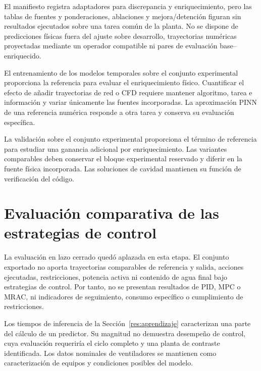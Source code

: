 El manifiesto registra adaptadores para discrepancia y enriquecimiento, pero las tablas de fuentes y ponderaciones, ablaciones y mejora/detención figuran sin resultados ejecutados sobre una tarea común de la planta. No se dispone de predicciones físicas fuera del ajuste sobre desarrollo, trayectorias numéricas proyectadas mediante un operador compatible ni pares de evaluación base--enriquecido.

El entrenamiento de los modelos temporales sobre el conjunto experimental proporciona la referencia para evaluar el enriquecimiento físico. Cuantificar el efecto de añadir trayectorias de red o CFD requiere mantener algoritmo, tarea e información y variar únicamente las fuentes incorporadas. La aproximación PINN de una referencia numérica responde a otra tarea y conserva su evaluación específica.

La validación sobre el conjunto experimental proporciona el término de referencia para estudiar una ganancia adicional por enriquecimiento. Las variantes comparables deben conservar el bloque experimental reservado y diferir en la fuente física incorporada. Las soluciones de cavidad mantienen su función de verificación del código.

\FloatBarrier

\section{Evaluación comparativa de las estrategias de control}
\label{res:control}

La evaluación en lazo cerrado quedó aplazada en esta etapa. El conjunto exportado no aporta trayectorias comparables de referencia y salida, acciones ejecutadas, restricciones, potencia activa ni contenido de agua final bajo estrategias de control. Por tanto, no se presentan resultados de PID, MPC o MRAC, ni indicadores de seguimiento, consumo específico o cumplimiento de restricciones.

Los tiempos de inferencia de la Sección~\ref{res:aprendizaje} caracterizan una parte del cálculo de un predictor. Su magnitud no demuestra desempeño de control, cuya evaluación requeriría el ciclo completo y una planta de contraste identificada. Los datos nominales de ventiladores se mantienen como caracterización de equipos y condiciones posibles del modelo.

\FloatBarrier
